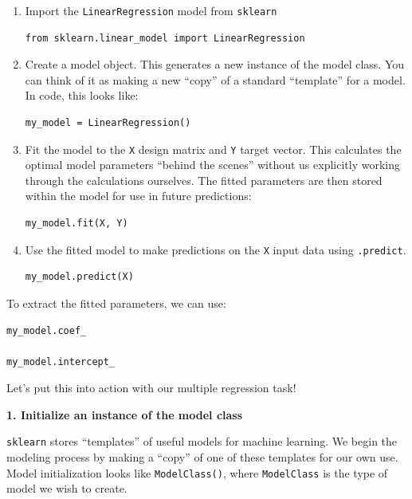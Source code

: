 \documentclass[
  letterpaper,
  DIV=11,
  numbers=noendperiod]{scrreprt}
\begin{document}
\begin{enumerate}
\def\labelenumi{\arabic{enumi}.}
\item
  Import the \texttt{LinearRegression} model from \texttt{sklearn}

\begin{verbatim}
from sklearn.linear_model import LinearRegression
\end{verbatim}
\item
  Create a model object. This generates a new instance of the model
  class. You can think of it as making a new ``copy'' of a standard
  ``template'' for a model. In code, this looks like:

\begin{verbatim}
my_model = LinearRegression()
\end{verbatim}
\item
  Fit the model to the \texttt{X} design matrix and \texttt{Y} target
  vector. This calculates the optimal model parameters ``behind the
  scenes'' without us explicitly working through the calculations
  ourselves. The fitted parameters are then stored within the model for
  use in future predictions:

\begin{verbatim}
my_model.fit(X, Y)
\end{verbatim}
\item
  Use the fitted model to make predictions on the \texttt{X} input data
  using \texttt{.predict}.

\begin{verbatim}
my_model.predict(X)
\end{verbatim}
\end{enumerate}

To extract the fitted parameters, we can use:

\begin{verbatim}
my_model.coef_

my_model.intercept_
\end{verbatim}

Let's put this into action with our multiple regression task!

\textbf{1. Initialize an instance of the model class}

\texttt{sklearn} stores ``templates'' of useful models for machine
learning. We begin the modeling process by making a ``copy'' of one of
these templates for our own use. Model initialization looks like
\texttt{ModelClass()}, where \texttt{ModelClass} is the type of model we
wish to create.
\end{document}
